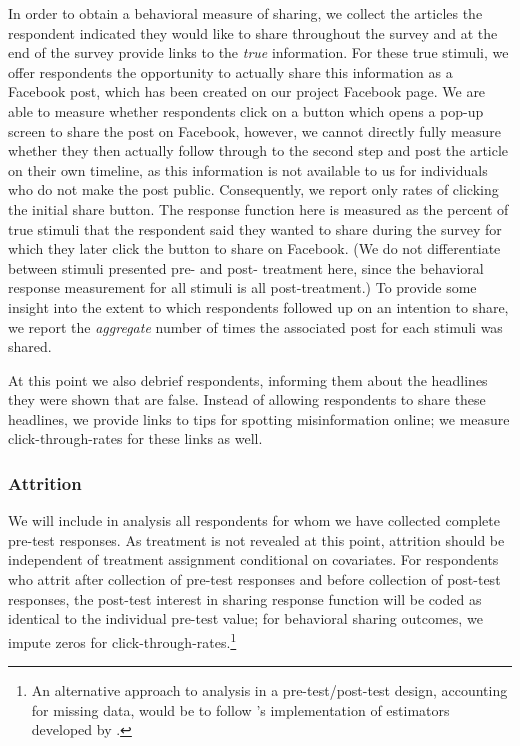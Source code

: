 \documentclass[letterpaper, 12pt, parskip=full,DIV=10]{scrartcl}
\begin{document}
In order to obtain a behavioral measure of sharing, we collect the articles the respondent indicated they would like to share throughout the survey and at the end of the survey provide links to the \textit{true} information. For these true stimuli, we offer respondents the opportunity to actually share this information as a Facebook post, which has been created on our project Facebook page. We are able to measure whether respondents click on a button which opens a pop-up screen to share the post on Facebook, however, we cannot directly fully measure whether they then actually follow through to the second step and post the article on their own timeline, as this information is not available to us for individuals who do not make the post public. Consequently, we report only rates of clicking the initial share button. The response function here is measured as the percent of true stimuli that the respondent said they wanted to share during the survey for which they later click the button to share on Facebook. (We do not differentiate between stimuli presented pre- and post- treatment here, since the behavioral response measurement for all stimuli is all post-treatment.) To provide some insight into the extent to which respondents followed up on an intention to share, we report the \textit{aggregate} number of times the associated post for each stimuli was shared. 

At this point we also debrief respondents, informing them about the headlines they were shown that are false. Instead of allowing respondents to share these headlines, we provide links to tips for spotting misinformation online; we measure click-through-rates for these links as well. 


\subsubsection{Attrition} We will include in analysis all respondents for whom we have collected complete pre-test responses. As treatment is not revealed at this point, attrition should be independent of treatment assignment conditional on covariates. For respondents who attrit after collection of pre-test responses and before collection of post-test responses, the post-test interest in sharing response function will be coded as identical to the individual pre-test value; for behavioral sharing outcomes, we impute zeros for click-through-rates.\footnote{An alternative approach to analysis in a pre-test/post-test design, accounting for missing data, would be to follow \cite{davidian2005semiparametric}'s implementation of estimators developed by \cite{robins1994estimation}.}
\end{document}
